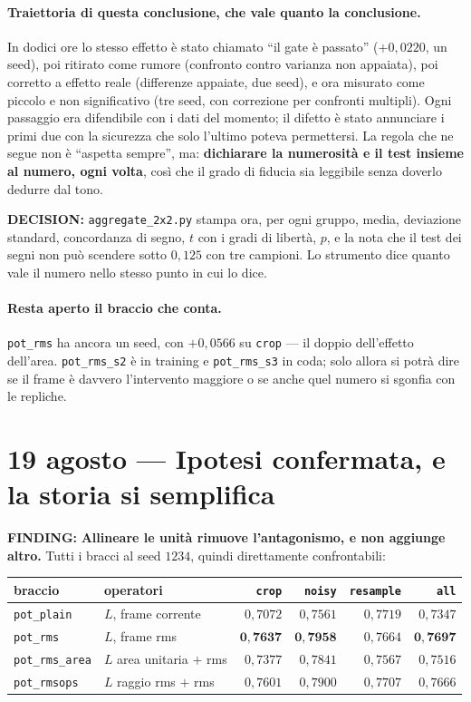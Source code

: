 \documentclass[11pt,a4paper]{article}
\newcommand{\finding}[1]{\textcolor{finding}{\textbf{FINDING:}} #1}
\newcommand{\decision}[1]{\textcolor{decision}{\textbf{DECISION:}} #1}
\begin{document}
\paragraph{Traiettoria di questa conclusione, che vale quanto la conclusione.} In dodici ore lo
stesso effetto \`e stato chiamato ``il gate \`e passato'' ($+0{,}0220$, un seed), poi ritirato
come rumore (confronto contro varianza non appaiata), poi corretto a effetto reale (differenze
appaiate, due seed), e ora misurato come piccolo e non significativo (tre seed, con correzione
per confronti multipli). Ogni passaggio era difendibile con i dati del momento; il difetto \`e
stato annunciare i primi due con la sicurezza che solo l'ultimo poteva permettersi. La regola
che ne segue non \`e ``aspetta sempre'', ma: \textbf{dichiarare la numerosit\`a e il test
insieme al numero, ogni volta}, cos\`i che il grado di fiducia sia leggibile senza doverlo
dedurre dal tono.

\decision{\texttt{aggregate\_2x2.py} stampa ora, per ogni gruppo, media, deviazione standard,
concordanza di segno, $t$ con i gradi di libert\`a, $p$, e la nota che il test dei segni non pu\`o
scendere sotto $0{,}125$ con tre campioni. Lo strumento dice quanto vale il numero nello stesso
punto in cui lo dice.}

\paragraph{Resta aperto il braccio che conta.} \texttt{pot\_rms} ha ancora un seed, con
$+0{,}0566$ su \texttt{crop} --- il doppio dell'effetto dell'area. \texttt{pot\_rms\_s2} \`e in
training e \texttt{pot\_rms\_s3} in coda; solo allora si potr\`a dire se il frame \`e davvero
l'intervento maggiore o se anche quel numero si sgonfia con le repliche.


\section{19 agosto --- Ipotesi confermata, e la storia si semplifica}

\finding{\textbf{Allineare le unit\`a rimuove l'antagonismo, e non aggiunge altro.} Tutti i
bracci al seed $1234$, quindi direttamente confrontabili:}

\begin{center}\small
\begin{tabular}{llrrrr}
\toprule
braccio & operatori & \texttt{crop} & \texttt{noisy} & \texttt{resample} & \texttt{all} \\
\midrule
\texttt{pot\_plain}     & $L$, frame corrente        & $0{,}7072$ & $0{,}7561$ & $0{,}7719$ & $0{,}7347$ \\
\texttt{pot\_rms}       & $L$, frame rms             & $\mathbf{0{,}7637}$ & $\mathbf{0{,}7958}$ & $0{,}7664$ & $\mathbf{0{,}7697}$ \\
\texttt{pot\_rms\_area} & $L$ area unitaria $+$ rms  & $0{,}7377$ & $0{,}7841$ & $0{,}7567$ & $0{,}7516$ \\
\texttt{pot\_rmsops}    & $L$ raggio rms $+$ rms     & $0{,}7601$ & $0{,}7900$ & $0{,}7707$ & $0{,}7666$ \\
\bottomrule
\end{tabular}
\end{center}
\end{document}
